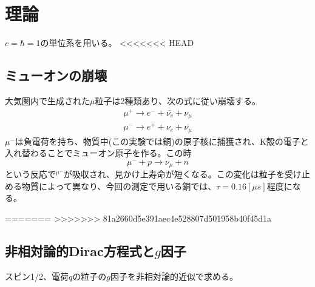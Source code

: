 \section{理論}
$c=\hbar=1$の単位系を用いる。
<<<<<<< HEAD
\subsection{ミューオンの崩壊}
大気圏内で生成された$\mu$粒子は2種類あり、次の式に従い崩壊する。
\begin{align}
\mu^+\to e^-+\bar{\nu_e}+\nu_\mu \\
\mu^-\to e^++{\nu_e}+\bar{\nu_\mu}
\end{align}
$\mu^-$は負電荷を持ち、物質中(この実験では銅)の原子核に捕獲され、K殻の電子と入れ替わることでミューオン原子を作る。この時
\begin{equation}
\mu^-+p \to\nu_\mu+n
\end{equation}
という反応で$^\mu^-$が吸収され、見かけ上寿命が短くなる。この変化は粒子を受け止める物質によって異なり、今回の測定で用いる銅では、$\tau=0.16[\mu s]$程度になる。

=======
>>>>>>> 81a2660d5e391aec4e528807d501958b40f45d1a
\subsection{非相対論的Dirac方程式と$g$因子}
スピン1/2、電荷$q$の粒子の$g$因子を非相対論的近似で求める。

